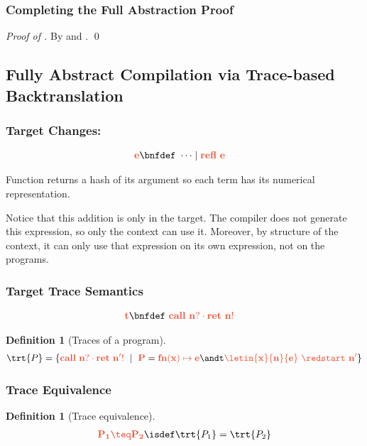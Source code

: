\documentclass{article}
\newtheorem{definition}[theorem]{Definition}
\theoremstyle{definition}
\begin{document}
\subsubsection{Completing the Full Abstraction Proof}
\begin{proof}[Proof of ]
	By  and .
	\qed
\end{proof}


\subsection{Fully Abstract Compilation via Trace-based Backtranslation}
\subsubsection{Target Changes: \Tr}
\begin{align*}
	\trg{e} \bnfdef&\
		\cdots \mid \trg{refl~e}
\end{align*}

\begin{center}
\end{center}
Function \card{\cdot} returns a hash of its argument so each term has its numerical representation.

Notice that this addition is only in the target.
The compiler does not generate this expression, so only the context can use it.
Moreover, by structure of the context, it can only use that expression on its own expression, not on the programs.


\subsubsection{Target Trace Semantics}
\begin{align*}
	\trg{t} \bnfdef&\
		\trg{call~n?\cdot ret~n!}
\end{align*}

\begin{definition}[Traces of a program]
	\begin{align*}
		\trt{P} = \myset{\trg{call~n?\cdot ret~n'!}}{ \trg{P}=\trg{fn(x)\mapsto e} \andt \trg{\letin{x}{n}{e}\ \redstart\ n'} }
	\end{align*}
\end{definition}

\subsubsection{Trace Equivalence}
\begin{definition}[Trace equivalence]
\begin{align*}
	\trg{P_1\teq P_2} \isdef \trt{P_1}=\trt{P_2}
\end{align*}
\end{definition}
\end{document}
